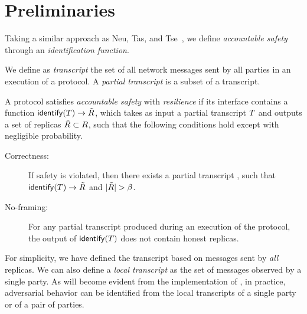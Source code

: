 \section{Preliminaries}



\label{sec:accountable-safety}
Taking a similar approach as Neu, Tas, and Tse~\cite[Def. 4]{FC:NeuTasTse22}, we define \emph{accountable safety} through an \emph{identification function}.

\begin{definition}
    We define as \emph{transcript} the set of all network messages sent by all parties in an execution of a protocol.
    A \emph{partial transcript} is a subset of a transcript.
\end{definition}

\begin{definition}\label{def:accountable-safety}
    A protocol satisfies \emph{accountable safety} with \emph{resilience} \beta if its interface contains a function $\mathsf{identify}(T) \rightarrow \tilde{R}$,
    which takes as input a partial transcript $T$ and outputs a set of replicas $\tilde{R} \subset R$, such that the
    following conditions hold except with negligible probability.
    \begin{description}
        \item[Correctness:] If safety is violated, then there exists a partial transcript \tran, such that $\mathsf{identify}(T) \rightarrow \tilde{R}$ and $|\cheaters| > \beta$.
        \item[No-framing:] For any partial transcript \tran produced during an execution of the protocol, the output of $\mathsf{identify}(T)$ does not contain honest replicas.
    \end{description}
\end{definition}

\begin{remark}
    For simplicity, we have defined the transcript based on messages sent by \emph{all} replicas.
    We can also define a \emph{local transcript} as the set of messages observed by a single party.
    As will become evident from the implementation of \identify{}, in practice, adversarial behavior can be identified from the local transcripts of a single party or  of a pair of parties.
\end{remark}